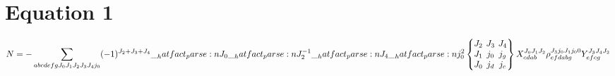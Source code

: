 \documentclass{scrartcl}
\newcommand{\ninej}[9]{\begingroup\setlength{\arraycolsep}{0.2em}\begin{Bmatrix} #1 & #2 & #3 \\ #4 & #5 & #6 \\ #7 & #8 & #9 \end{Bmatrix}\endgroup}
\begin{document}
\section{Equation 1}
\begin{dmath*}
N = -\sum_{a b c d e f g {J}_{0} {J}_{1} {J}_{2} {J}_{3} {J}_{4} {j}_{0}} \* (-1)^{{J}_{2}+{J}_{3}+{J}_{4}} \* \hatfact{{J}_{0}} \* \hatfact{{J}_{2}^{-1}} \* \hatfact{{J}_{4}} \* \hatfact{{j}_{0}^{2}} \* \ninej{{J}_{2}}{{J}_{3}}{{J}_{4}}{{J}_{1}}{{j}_{0}}{{j}_{g}}{{J}_{0}}{{j}_{d}}{{j}_{c}} \* X_{c d a b}^{{J}_{0} {J}_{1} {J}_{2}} \* \rho_{e f d a b g}^{{J}_{3} {j}_{0} {J}_{1} {j}_{0} 0} \* Y_{e f c g}^{{J}_{3} {J}_{4} {J}_{2}}
\end{dmath*}
\end{document}

